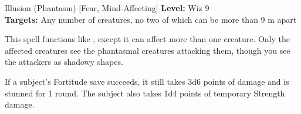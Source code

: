 {Illusion (Phantasm) [Fear, Mind-Affecting]}
{
	\textbf{Level:}
	Wiz 9\\
	\textbf{Targets:}
	Any number of creatures, no two of which can be more than 9 m apart\\
}
{
	This spell functions like , except it can affect more than one creature. Only the affected creatures see the phantasmal creatures attacking them, though you see the attackers as shadowy shapes.

	If a subject's Fortitude save succeeds, it still takes 3d6 points of damage and is stunned for 1 round. The subject also takes 1d4 points of temporary Strength damage.

}
